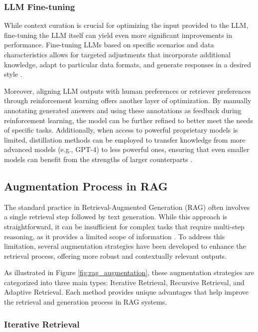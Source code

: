 \subsubsection{LLM Fine-tuning}

While context curation is crucial for optimizing the input provided to the LLM, fine-tuning the LLM itself can yield even more significant improvements in performance. Fine-tuning LLMs based on specific scenarios and data characteristics allows for targeted adjustments that incorporate additional knowledge, adapt to particular data formats, and generate responses in a desired style \cite{du2022retrieval}.

Moreover, aligning LLM outputs with human preferences or retriever preferences through reinforcement learning offers another layer of optimization. By manually annotating generated answers and using these annotations as feedback during reinforcement learning, the model can be further refined to better meet the needs of specific tasks. Additionally, when access to powerful proprietary models is limited, distillation methods can be employed to transfer knowledge from more advanced models (e.g., GPT-4) to less powerful ones, ensuring that even smaller models can benefit from the strengths of larger counterparts \cite{shi2023dual}.

\subsection{Augmentation Process in RAG}

The standard practice in Retrieval-Augmented Generation (RAG) often involves a single retrieval step followed by text generation. While this approach is straightforward, it can be insufficient for complex tasks that require multi-step reasoning, as it provides a limited scope of information \cite{yoran2023making}. To address this limitation, several augmentation strategies have been developed to enhance the retrieval process, offering more robust and contextually relevant outputs.

As illustrated in Figure \ref{fig:rag_augmentation}, these augmentation strategies are categorized into three main types: Iterative Retrieval, Recursive Retrieval, and Adaptive Retrieval. Each method provides unique advantages that help improve the retrieval and generation process in RAG systems.

\subsubsection{Iterative Retrieval}

